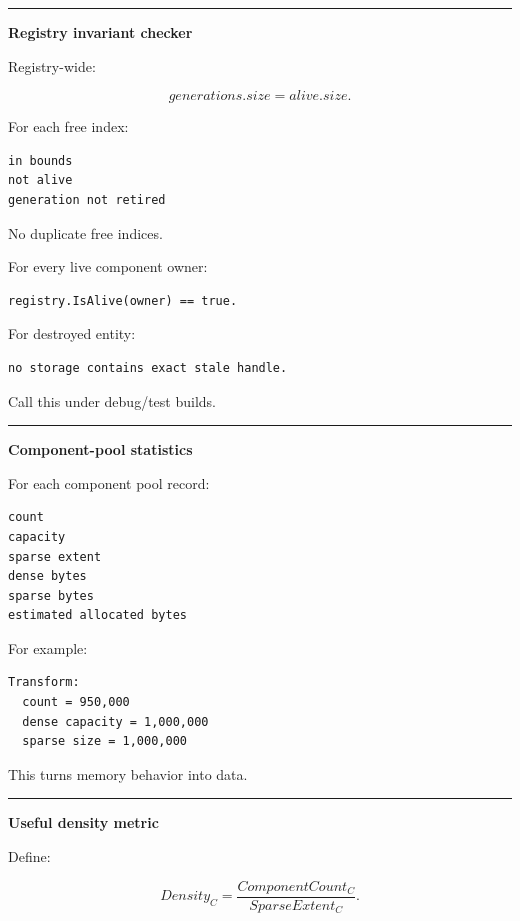 \begin{center}\rule{0.5\linewidth}{0.5pt}\end{center}

\textbf{Registry invariant checker}

Registry-wide:

\[
generations.size=alive.size.
\]

For each free index:

\begin{verbatim}
in bounds
not alive
generation not retired
\end{verbatim}

No duplicate free indices.

For every live component owner:

\begin{verbatim}
registry.IsAlive(owner) == true.
\end{verbatim}

For destroyed entity:

\begin{verbatim}
no storage contains exact stale handle.
\end{verbatim}

Call this under debug/test builds.

\begin{center}\rule{0.5\linewidth}{0.5pt}\end{center}

\textbf{Component-pool statistics}

For each component pool record:

\begin{verbatim}
count
capacity
sparse extent
dense bytes
sparse bytes
estimated allocated bytes
\end{verbatim}

For example:

\begin{verbatim}
Transform:
  count = 950,000
  dense capacity = 1,000,000
  sparse size = 1,000,000
\end{verbatim}

This turns memory behavior into data.

\begin{center}\rule{0.5\linewidth}{0.5pt}\end{center}

\textbf{Useful density metric}

Define:

\[
Density_C=
\frac{ComponentCount_C}
{SparseExtent_C}.
\]

